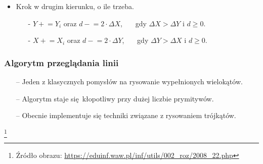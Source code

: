 \documentclass[usenames,dvipsnames,aspectratio=43,presentation]{beamer}
\begin{document}
\begin{frame}
\begin{itemize}
\begin{itemize}
\begin{itemize}
                                \end{itemize}
                          \item Krok w drugim kierunku, o ile trzeba.
                                \begin{itemize}
                                    \scriptsize
                                    \item[-] $Y \mathrel{+}= Y_i$ oraz $d \mathrel{-}= 2 \cdot \Delta{X}$, ~~~gdy $\Delta{X} > \Delta{Y}$ i $d \ge 0$.
                                    \item[-] $X \mathrel{+}= X_i$ oraz $d \mathrel{-}= 2 \cdot \Delta{Y}$, ~~~gdy $\Delta{Y} > \Delta{X}$ i $d \ge 0$.
                                \end{itemize}
                      \end{itemize}
        \end{itemize}
    \end{frame}


    \begin{frame}
        \frametitle{Algorytm przeglądania linii}
        \footnotesize

        \begin{itemize}
            \item[--] Jeden z klasycznych pomysłów na rysowanie wypełnionych wielokątów.
            \item[--] Algorytm staje się kłopotliwy przy dużej liczbie prymitywów.
            \item[--] Obecnie implementuje się techniki związane z rysowaniem trójkątów.
        \end{itemize}

        \vfill

        \begin{minipage}{\textwidth}
            \centering

        \end{minipage}
        
        \let\thefootnote\relax\footnote[frame]{
            \tiny
            \hspace{-3.25em}
            Źródło obrazu:
            \url{https://eduinf.waw.pl/inf/utils/002_roz/2008_22.php}
        }
    \end{frame}
\end{document}
